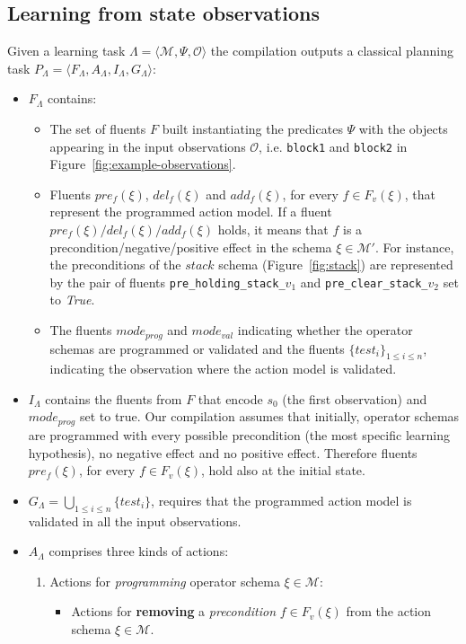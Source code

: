 \documentclass[3p,times]{elsarticle}
\newcommand{\tup}[1]{{\langle #1 \rangle}}
\begin{document}
\subsection{Learning from state observations}
Given a learning task $\Lambda=\tup{\mathcal{M},\Psi,\mathcal{O}}$ the compilation outputs a classical planning task $P_{\Lambda}=\tup{F_{\Lambda},A_{\Lambda},I_{\Lambda},G_{\Lambda}}$:
\begin{itemize}
\item $F_{\Lambda}$ contains:
\begin{itemize}
\item The set of fluents $F$ built instantiating the predicates $\Psi$ with the objects appearing in the input observations $\mathcal{O}$, i.e. {\tt\small block1} and {\tt\small block2} in Figure~\ref{fig:example-observations}.
\item Fluents $pre_f(\xi)$, $del_f(\xi)$ and $add_f(\xi)$, for every $f\in F_v(\xi)$, that represent the programmed action model. If a fluent $pre_f(\xi)/del_f(\xi)/add_f(\xi)$ holds, it means that $f$ is a precondition/negative/positive effect in the schema $\xi\in \mathcal{M}'$. For instance, the preconditions of the $stack$ schema (Figure~\ref{fig:stack}) are represented by the pair of fluents {\small\tt pre\_holding\_stack\_$v_1$} and {\small\tt pre\_clear\_stack\_$v_2$} set to {\em True}.
\item The fluents $mode_{prog}$ and $mode_{val}$ indicating whether the operator schemas are programmed or validated and the fluents $\{test_i\}_{1\leq i\leq n}$, indicating the observation where the action model is validated.
\end{itemize}
\item $I_{\Lambda}$ contains the fluents from $F$ that encode $s_0$ (the first observation) and $mode_{prog}$ set to true. Our compilation assumes that initially, operator schemas are programmed with every possible precondition (the most specific learning hypothesis), no negative effect and no positive effect. Therefore fluents $pre_f(\xi)$, for every $f\in F_v(\xi)$, hold also at the initial state. 

\item $G_{\Lambda}=\bigcup_{1\leq i\leq n}\{test_i\}$, requires that the programmed action model is validated in all the input observations.
\item $A_{\Lambda}$ comprises three kinds of actions:
\begin{enumerate}
\item Actions for {\em programming} operator schema $\xi\in\mathcal{M}$:
\begin{itemize}
\item Actions for {\bf removing} a {\em precondition} $f\in F_v(\xi)$ from the action schema $\xi\in\mathcal{M}$.


\end{itemize}
\end{enumerate}
\end{itemize}
\end{document}
